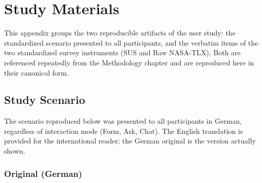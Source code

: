 \chapter{Study Materials}
\label{app:materials}

This appendix groups the two reproducible artifacts of the user study: the standardized scenario presented to all participants, and the verbatim items of the two standardized survey instruments (SUS and Raw NASA-TLX). Both are referenced repeatedly from the Methodology chapter and are reproduced here in their canonical form.

\section{Study Scenario}
\label{app:scenario}

The scenario reproduced below was presented to all participants in German, regardless of interaction mode (Form, Ask, Chat). The English translation is provided for the international reader; the German original is the version actually shown.

\subsection{Original (German)}
\label{app:scenario-de}

